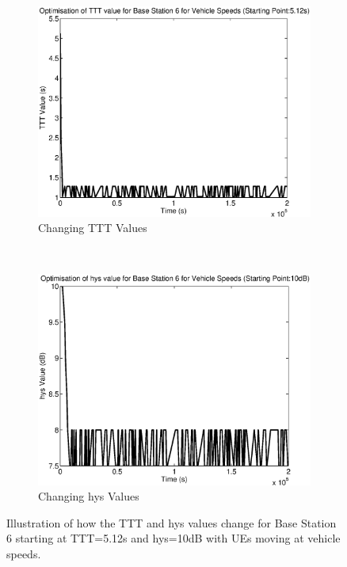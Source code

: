 \begin{figure}[H]
        \centering
        \begin{subfigure}[b]{0.49\textwidth}
                \includegraphics[width=\textwidth]{figures/graphs/vehhigh/TTT6.eps}
                \caption{Changing TTT Values}
        \end{subfigure}%
        ~ %
        \begin{subfigure}[b]{0.49\textwidth}
                \includegraphics[width=\textwidth]{figures/graphs/vehhigh/hys6.eps}
                \caption{Changing hys Values}
        \end{subfigure}
        \caption{Illustration of how the TTT and hys values change for Base Station 6 starting at TTT=5.12s and hys=10dB with UEs moving at vehicle speeds.}
\end{figure}
